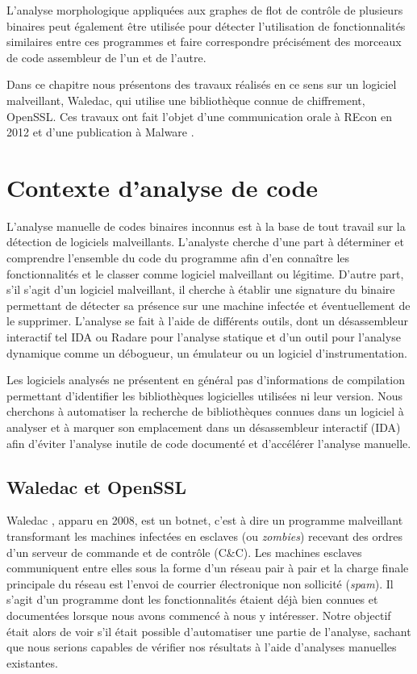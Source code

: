 L'analyse morphologique appliquées aux graphes de flot de contrôle de plusieurs binaires peut également être utilisée pour détecter l'utilisation de fonctionnalités similaires entre ces programmes et faire correspondre précisément des morceaux de code assembleur de l'un et de l'autre.

Dans ce chapitre nous présentons des travaux réalisés en ce sens sur un logiciel malveillant, Waledac, qui utilise une bibliothèque connue de chiffrement, OpenSSL.
Ces travaux ont fait l'objet d'une communication orale à REcon en 2012 \cite{REAT12} et d'une publication à Malware \cite{mal12}.

\section{Contexte d'analyse de code}
L'analyse manuelle de codes binaires inconnus est à la base de tout travail sur la détection de logiciels malveillants.
L'analyste cherche d'une part à déterminer et comprendre l'ensemble du code du programme afin d'en connaître les fonctionnalités
et le classer comme logiciel malveillant ou légitime.
D'autre part, s'il s'agit d'un logiciel malveillant, il cherche à établir une signature du binaire permettant de détecter sa présence sur une machine infectée et éventuellement de le supprimer.
L'analyse se fait à l'aide de différents outils, dont un désassembleur interactif tel IDA \cite{IDA} ou Radare \cite{radare} pour l'analyse statique et d'un outil pour l'analyse dynamique comme un débogueur, un émulateur ou un logiciel d'instrumentation.

Les logiciels analysés ne présentent en général pas d'informations de compilation permettant d'identifier les bibliothèques logicielles utilisées ni leur version. Nous cherchons à automatiser la recherche de bibliothèques connues dans un logiciel à analyser et à marquer son emplacement dans un désassembleur interactif (IDA) afin d'éviter l'analyse inutile de code documenté et d'accélérer l'analyse manuelle.

\subsection{Waledac et OpenSSL}
Waledac \cite{CRFLSGBA10}, apparu en 2008, est un botnet, c'est à dire un programme malveillant transformant les machines infectées en esclaves (ou \emph{zombies}) recevant des ordres d'un serveur de commande et de contrôle (C\&C).
Les machines esclaves communiquent entre elles sous la forme d'un réseau pair à pair et la charge finale principale du réseau est l'envoi de courrier électronique non sollicité (\emph{spam}).
Il s'agit d'un programme dont les fonctionnalités étaient déjà bien connues et documentées lorsque nous avons commencé à nous y intéresser. Notre objectif était alors de voir s'il était possible d'automatiser une partie de l'analyse, sachant que nous serions capables de vérifier nos résultats à l'aide d'analyses manuelles existantes.

